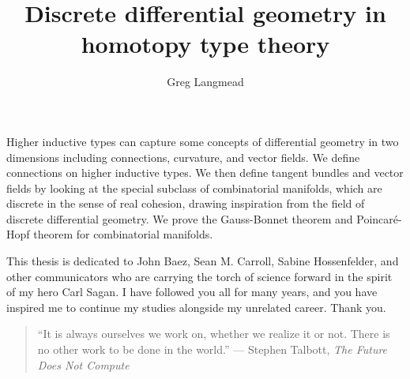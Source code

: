\documentclass[12pt,fleqn]{article}
\title{Discrete differential geometry in homotopy type theory}
\author{Greg Langmead}
\renewenvironment{abstract}{\section*{\abstractname}}{}
\begin{document}
\maketitle

\begin{abstract}
Higher inductive types can capture some concepts of differential geometry in two dimensions including connections, curvature, and vector fields. We define connections on higher inductive types. We then define tangent bundles and vector fields by looking at the special subclass of combinatorial manifolds, which are discrete in the sense of real cohesion\cite{shulman_cohesion}, drawing inspiration from the field of discrete differential geometry. We prove the Gauss-Bonnet theorem and Poincaré-Hopf theorem for combinatorial manifolds.
\end{abstract}

\begin{dedication}
This thesis is dedicated to John Baez, Sean M. Carroll, Sabine Hossenfelder, and other communicators who are carrying the torch of science forward in the spirit of my hero Carl Sagan. I have followed you all for many years, and you have inspired me to continue my studies alongside my unrelated career. Thank you.

\begin{quote} 
\centering
``It is always ourselves we work on, whether we realize it or not. There is no other work to be done in the world.'' --- Stephen Talbott, \emph{The Future Does Not Compute}\cite{talbott}
\end{quote}
\end{dedication}

\listofchanges[title=Changelist]
\listoftodos
\clearpage


\tableofcontents 
\clearpage

\clearpage

\clearpage

\clearpage

\clearpage

\clearpage

\clearpage
% 


\end{document}
